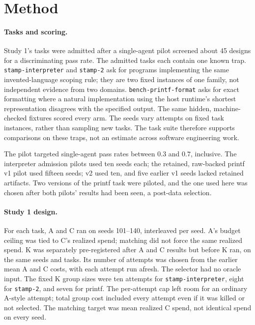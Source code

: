 \section{Method}
\label{sec:method}

\paragraph{Tasks and scoring.}
Study 1's tasks were admitted after a single-agent pilot screened about 45 designs for a discriminating pass rate. The admitted tasks each contain one known trap. \texttt{stamp-interpreter} and \texttt{stamp-2} ask for programs implementing the same invented-language scoping rule; they are two fixed instances of one family, not independent evidence from two domains. \texttt{bench-printf-format} asks for exact formatting where a natural implementation using the host runtime's shortest representation disagrees with the specified output. The same hidden, machine-checked fixtures scored every arm. The seeds vary attempts on fixed task instances, rather than sampling new tasks. The task suite therefore supports comparisons on these traps, not an estimate across software engineering work.


The pilot targeted single-agent pass rates between $0.3$ and $0.7$, inclusive. The interpreter admission pilots used ten seeds each; the retained, raw-backed printf v1 pilot used fifteen seeds; v2 used ten, and five earlier v1 seeds lacked retained artifacts. Two versions of the printf task were piloted, and the one used here was chosen after both pilots' results had been seen, a post-data selection.

\paragraph{Study 1 design.}
For each task, A and C ran on seeds 101--140, interleaved per seed. A's budget ceiling was tied to C's realized spend; matching did not force the same realized spend. K was separately pre-registered after A and C results but before K ran, on the same seeds and tasks. Its number of attempts was chosen from the earlier mean A and C costs, with each attempt run afresh. The selector had no oracle input. The fixed K group sizes were ten attempts for \texttt{stamp-interpreter}, eight for \texttt{stamp-2}, and seven for printf. The per-attempt cap left room for an ordinary A-style attempt; total group cost included every attempt even if it was killed or not selected. The matching target was mean realized C spend, not identical spend on every seed.

